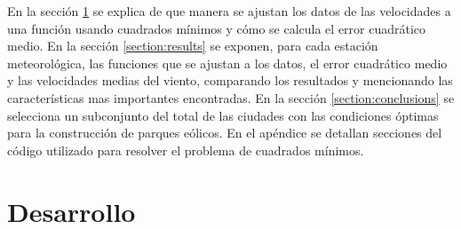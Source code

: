 \documentclass[journal, monochrome]{IEEEtran}
\begin{document}
\par
En la sección \ref{section:development} se explica de que manera se ajustan los datos de las velocidades a una función usando cuadrados mínimos y cómo se calcula el error cuadrático medio. En la sección \ref{section:results} se exponen, para cada estación meteorológica, las funciones que se ajustan a los datos, el error cuadrático medio y las velocidades medias del viento, comparando los resultados y mencionando las características mas importantes encontradas. En la sección \ref{section:conclusions} se selecciona un subconjunto del total de las ciudades con las condiciones óptimas para la construcción de parques eólicos. En el apéndice se detallan secciones del código utilizado para resolver el problema de cuadrados mínimos.
\vspace{1cm}
\section{Desarrollo}
\label{section:development}
\vspace{0.5cm}
\end{document}
